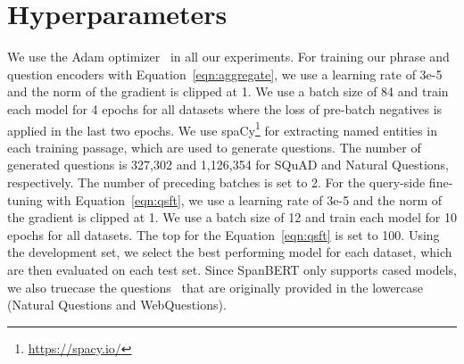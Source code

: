 \documentclass[11pt,a4paper]{article}
\begin{document}
\section{Hyperparameters}\label{apdx:hyper}
We use the Adam optimizer~\citep{kingma2014adam} in all our experiments.
For training our phrase and question encoders with Equation~\eqref{eqn:aggregate}, we use a learning rate of 3e-5 and the norm of the gradient is clipped at 1.
We use a batch size of 84 and train each model for 4 epochs for all datasets where the loss of pre-batch negatives is applied in the last two epochs.
We use spaCy\footnote{\url{https://spacy.io/}} for extracting named entities in each training passage, which are used to generate questions.
The number of generated questions is 327,302 and 1,126,354 for SQuAD and Natural Questions, respectively.
The number of preceding batches  is set to 2.
For the query-side fine-tuning with Equation~\eqref{eqn:qsft}, we use a learning rate of 3e-5 and the norm of the gradient is clipped at 1.
We use a batch size of 12 and train each model for 10 epochs for all datasets.
The top  for the Equation~\eqref{eqn:qsft} is set to 100.
Using the development set, we select the best performing model for each dataset, which are then evaluated on each test set.
Since SpanBERT only supports cased models, we also truecase the questions~\citep{lita2003truecasing} that are originally provided in the lowercase (Natural Questions and WebQuestions). 
\end{document}
